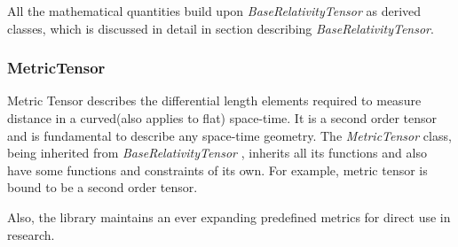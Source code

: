 \documentclass[refree]{aa}
\begin{document}
All the mathematical quantities build upon \textit{BaseRelativityTensor} as derived classes, which is discussed in detail in section describing \textit{BaseRelativityTensor}.

\subsubsection{MetricTensor}
Metric Tensor describes the differential length elements required to measure distance in a curved(also applies to flat) space-time. It is a second order tensor and is fundamental to describe any space-time geometry. The \textit{MetricTensor} class, being inherited from  \textit{BaseRelativityTensor} , inherits all its functions and also have some functions and constraints of its own. For example, metric tensor is bound to be a second order tensor.


Also, the library maintains an ever expanding predefined metrics for direct use in research.



\end{document}
